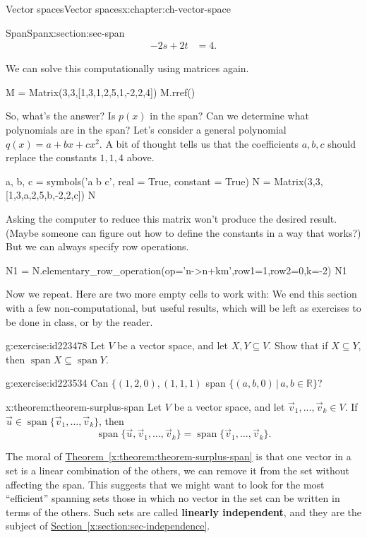 \documentclass[oneside,10pt,]{book}
\newcommand{\terminology}[1]{\textbf{#1}}
\numberwithin{equation}{section}
\newcommand{\spn}{\operatorname{span}}
\newcommand{\R}{\mathbb{R}}
\newcommand{\amp}{&}
\begin{document}
\begin{chapterptx}{Vector spaces}{}{Vector spaces}{}{}{x:chapter:ch-vector-space}
\begin{sectionptx}{Span}{}{Span}{}{}{x:section:sec-span}
\begin{align*}
-2s+2t \amp =4\text{.}
\end{align*}
%
\par
We can solve this computationally using matrices again.%
\begin{sageinput}
M = Matrix(3,3,[1,3,1,2,5,1,-2,2,4])
M.rref()
\end{sageinput}
So, what's the answer? Is \(p(x)\) in the span? Can we determine what polynomials are in the span? Let's consider a general polynomial \(q(x)=a+bx+cx^2\). A bit of thought tells us that the coefficients \(a,b,c\) should replace the constants \(1,1,4\) above.%
\begin{sageinput}
a, b, c = symbols('a b c', real = True, constant = True)
N = Matrix(3,3,[1,3,a,2,5,b,-2,2,c])
N
\end{sageinput}
Asking the computer to reduce this matrix won't produce the desired result. (Maybe someone can figure out how to define the constants in a way that works?) But we can always specify row operations.%
\begin{sageinput}
N1 = N.elementary_row_operation(op='n->n+km',row1=1,row2=0,k=-2)
N1
\end{sageinput}
Now we repeat. Here are two more empty cells to work with:%
We end this section with a few non-computational, but useful results, which will be left as exercises to be done in class, or by the reader.%
\begin{inlineexercise}{}{g:exercise:id223478}%
Let \(V\) be a vector space, and let \(X,Y\subseteq V\). Show that if \(X\subseteq Y\), then \(\spn X \subseteq \spn Y\).%
\end{inlineexercise}
\begin{inlineexercise}{}{g:exercise:id223534}%
Can \(\{(1,2,0), (1,1,1)\) span \(\{(a,b,0)\,|\, a,b \in\R\}\)?%
\end{inlineexercise}
\begin{theorem}{}{}{x:theorem:theorem-surplus-span}%
Let \(V\) be a vector space, and let \(\vec{v}_1,\ldots, \vec{v}_k\in V\). If \(\vec{u}\in \spn\{\vec{v}_1,\ldots, \vec{v}_k\}\), then%
\begin{equation*}
\spn\{\vec{u},\vec{v}_1,\ldots, \vec{v}_k\} = \spn\{\vec{v}_1,\ldots, \vec{v}_k\}\text{.}
\end{equation*}
%
\end{theorem}
The moral of \hyperref[x:theorem:theorem-surplus-span]{Theorem~\ref{x:theorem:theorem-surplus-span}} is that one vector in a set is a linear combination of the others, we can remove it from the set without affecting the span. This suggests that we might want to look for the most ``efficient'' spanning sets \textendash{} those in which no vector in the set can be written in terms of the others. Such sets are called \terminology{linearly independent}, and they are the subject of \hyperref[x:section:sec-independence]{Section~\ref{x:section:sec-independence}}.%

\end{sectionptx}
\end{chapterptx}
\end{document}
